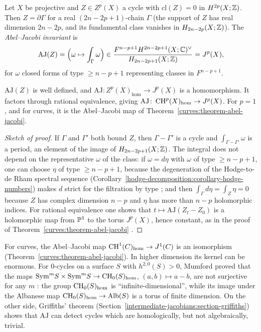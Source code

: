 \begin{definition}\label{intermediate-jacobians:definition-abel-jacobi}
Let $X$ be projective and $Z \in Z^p(X)$ a cycle with $\mathrm{cl}(Z) = 0$ in $H^{2p}(X; \mathbb{Z})$. Then $Z = \partial\Gamma$ for a real $(2n - 2p + 1)$-chain $\Gamma$ (the support of $Z$ has real dimension
$2n - 2p$, and its fundamental class vanishes in $H_{2n-2p}(X; \mathbb{Z})$). The \emph{Abel--Jacobi invariant} is
\[
\mathrm{AJ}(Z) = \Big(\omega \mapsto \int_\Gamma\omega\Big) \in \frac{F^{n-p+1}H^{2n-2p+1}(X; \mathbb{C})^\vee}{H_{2n-2p+1}(X; \mathbb{Z})} = J^p(X),
\]
for $\omega$ closed forms of type $\geq n - p + 1$ representing classes in $F^{n-p+1}$.
\end{definition}

\begin{proposition}\label{intermediate-jacobians:proposition-abel-jacobi}
$\mathrm{AJ}(Z)$ is well defined, and $\mathrm{AJ} \colon Z^p(X)_{\mathrm{hom}} \to J^p(X)$ is a homomorphism. It factors through rational equivalence, giving
$\mathrm{AJ} \colon \operatorname{CH}^p(X)_{\mathrm{hom}} \to J^p(X)$. For $p = 1$, and for curves, it is the Abel--Jacobi map of Theorem~\ref{curves:theorem-abel-jacobi}.
\end{proposition}

\begin{proof}[Sketch of proof]
If $\Gamma$ and $\Gamma'$ both bound $Z$, then $\Gamma - \Gamma'$ is a cycle and $\int_{\Gamma-\Gamma'}\omega$ is a period, an element of the image of $H_{2n-2p+1}(X; \mathbb{Z})$. The integral does not depend on the
representative $\omega$ of the class: if $\omega = d\eta$ with $\omega$ of type $\geq n - p + 1$, one can choose $\eta$ of type $\geq n - p + 1$, because the degeneration of the
Hodge-to-de Rham spectral sequence (Corollary~\ref{hodge-decomposition:corollary-hodge-numbers}) makes $d$ strict for the filtration by type \cite[Chapter 8]{voisin-hodge-1}; and then $\int_\Gamma d\eta = \int_Z\eta = 0$ because $Z$ has complex dimension $n - p$ and $\eta$ has more than $n - p$ holomorphic indices. For
rational equivalence one shows that $t \mapsto \mathrm{AJ}(Z_t - Z_0)$ is a holomorphic map from $\mathbb{P}^1$ to the torus $J^p(X)$, hence constant, as in the proof of
Theorem~\ref{curves:theorem-abel-jacobi} \cite[Chapter 12]{voisin-hodge-1}.
\end{proof}

\begin{remark}\label{intermediate-jacobians:remark-kernel-abel-jacobi}
For curves, the Abel--Jacobi map $\operatorname{CH}^1(C)_{\mathrm{hom}} \to J^1(C)$ is an isomorphism (Theorem~\ref{curves:theorem-abel-jacobi}). In higher dimension its kernel can be enormous. For $0$-cycles on a
surface $S$ with $h^{2,0}(S) > 0$, Mumford proved that the maps $\mathrm{Sym}^mS \times \mathrm{Sym}^mS \to \operatorname{CH}_0(S)_{\mathrm{hom}}$, $(a, b) \mapsto a - b$, are not surjective for any $m$
\cite{mumford-1968}: the group $\operatorname{CH}_0(S)_{\mathrm{hom}}$ is ``infinite-dimensional'', while its image under the Albanese map $\operatorname{CH}_0(S)_{\mathrm{hom}} \to \mathrm{Alb}(S)$ is a torus of finite dimension. On the other side, Griffiths' theorem (Section~\ref{intermediate-jacobians:section-griffiths}) shows that $\mathrm{AJ}$ can detect cycles which are homologically, but not algebraically,
trivial.
\end{remark}


